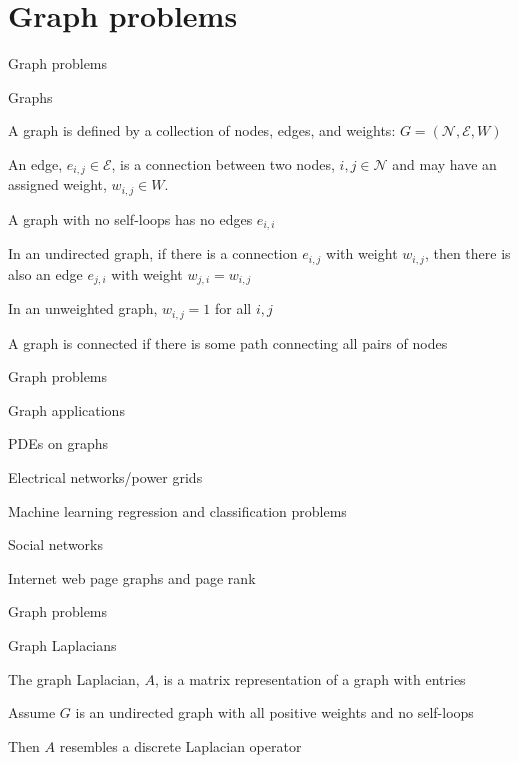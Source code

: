 \documentclass[18pt,xcolor=table]{beamer}
\begin{document}

\section{Graph problems}

\begin{frame}{Graph problems}
\begin{block}{Graphs}
\bit
\item A graph is defined by a collection of nodes, edges, and weights: $G = (\mathcal{N},\mathcal{E},W)$
\item An edge, $e_{i,j}\in\mathcal{E}$, is a connection between two nodes, $i,j\in\mathcal{N}$ and may have an assigned weight, $w_{i,j}\in W$.
\item A graph with no self-loops has no edges $e_{i,i}$
\item In an undirected graph, if there is a connection $e_{i,j}$ with weight $w_{i,j}$, then there is also an edge $e_{j,i}$ with weight $w_{j,i} = w_{i,j}$
\item In an unweighted graph, $w_{i,j} = 1$ for all $i,j$
\item A graph is connected if there is some path connecting all pairs of nodes
\eit
\end{block}
\end{frame}

\begin{frame}{Graph problems}
\begin{block}{Graph applications}
\bit
\item PDEs on graphs
\item Electrical networks/power grids
\item Machine learning regression and classification problems
\item Social networks
\item Internet web page graphs and page rank
\eit
\end{block}
\end{frame}

\begin{frame}{Graph problems}
\begin{block}{Graph Laplacians}
\bit
\item The graph Laplacian, $A$, is a matrix representation of a graph with entries
\item Assume $G$ is an undirected graph with all positive weights and no self-loops
\item Then $A$ resembles a discrete Laplacian operator 
\eit
\end{block}
\end{frame}
\end{document}
